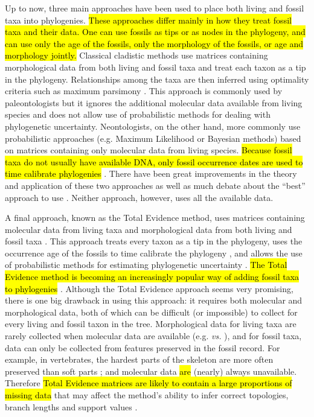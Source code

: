 \documentclass[12pt,letterpaper]{article}
\begin{document}
Up to now, three main approaches have been used to place both living and fossil taxa into phylogenies.
\hl{These approaches differ mainly in how they treat fossil taxa and their data.
One can use fossils as tips or as nodes in the phylogeny, and can use only the age of the fossils, only the morphology of the fossils, or age and morphology jointly.}
Classical cladistic methods use matrices containing morphological data from both living and fossil taxa and treat each taxon as a tip in the phylogeny. Relationships among the taxa are then inferred using optimality criteria such as maximum parsimony \citep{Hennig1966,felsenstein2004}.
This approach is commonly used by paleontologists but it ignores the additional molecular data available from living species and does not allow use of probabilistic methods for dealing with phylogenetic uncertainty.
Neontologists, on the other hand, more commonly use probabilistic approaches (e.g. Maximum Likelihood or Bayesian methods) based on matrices containing only molecular data from living species.
\hl{Because fossil taxa do not usually have available DNA, only fossil occurrence dates are used to time calibrate phylogenies }\citep{zuckerkandl1965}.
There have been great improvements in the theory and application of these two approaches \citep[e.g.][]{bapsta2013,stadlerdating2013,heaththe2013} as well as much debate about the ``best'' approach to use \citep[e.g.][]{spencerefficacy2013,wrightbayesian2014}.
Neither approach, however, uses all the available data.

A final approach, known as the Total Evidence method, uses matrices containing molecular data from living taxa and morphological data from both living and fossil taxa \citep{eernissetaxonomic1993}.
This approach treats every taxon as a tip in the phylogeny, uses the occurrence age of the fossils to time calibrate the phylogeny \citep[known as tip-dating;][]{ronquista2012}, and allows the use of probabilistic methods for estimating phylogenetic uncertainty \citep{ronquista2012}.
\hl{The Total Evidence method is becoming an increasingly popular way of adding fossil taxa to phylogenies} \citep[e.g.][]{pyrondivergence2011,ronquista2012,schragocombining2013,slaterphylogenetic2013,beckancient2014,Arcila2015131}.
Although the Total Evidence approach seems very promising, there is one big drawback in using this approach: it requires both molecular and morphological data, both of which can be difficult (or impossible) to collect for every living and fossil taxon in the tree.
Morphological data for living taxa are rarely collected when molecular data are available (e.g. \citealp{O'Leary08022013} \textit{vs.} \citealp{meredithimpacts2011}), and for fossil taxa, data can only be collected from features preserved in the fossil record.
For example, in vertebrates, the hardest parts of the skeleton are more often preserved than soft parts \citep{sansomfossilization2013}; and molecular data \hl{are} (nearly) always unavailable.
Therefore \hl{Total Evidence matrices are likely to contain a large proportions of missing data} that may affect the method's ability to infer correct topologies, branch lengths and support values \citep{salamin2003}. 
\end{document}
